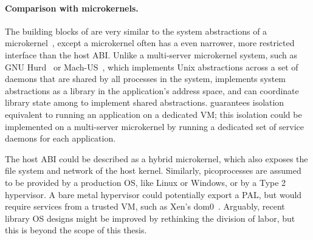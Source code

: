 

\paragraph{Comparison with microkernels.}
The building blocks of \graphene{} are very similar to the system abstractions of a 
microkernel~\cite{liedtke95sosp,klein09sel4,elphinstone13microkernels,liedtke93sosp,chen93memory,baron1985mach-1,accetta86mach}, except a microkernel often has a even narrower, more restricted interface than the host ABI.
Unlike a multi-server microkernel system, such as GNU Hurd~\cite{hurd} or Mach-US~\cite{stevenson95mach-us}, which implements Unix abstractions across a set of daemons that are shared by all processes in the system, \graphene{} implements system abstractions as a library in the application's address space, and can coordinate library state among \picoprocs{} to implement shared abstractions. \graphene{} guarantees isolation equivalent to running 
an application on a dedicated VM; this isolation could be implemented on a multi-server microkernel by running a dedicated set of service daemons for each application.


The \graphene{} host ABI could be described as a hybrid microkernel, which also exposes the file system and network of the host kernel.
Similarly, picoprocesses are assumed to be provided by a production OS, like Linux or Windows, or by a Type 2 hypervisor.  A bare metal hypervisor could potentially export a PAL, but would require services from a trusted VM, such as Xen's dom0~\cite{barham03xen}.
Arguably, recent library OS designs might be improved by rethinking the division of labor, but this is beyond the scope of this thesis.

